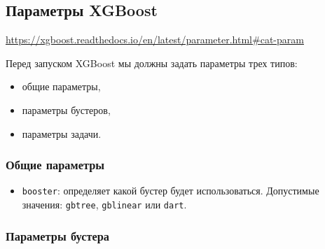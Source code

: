 \documentclass[%
	11pt,
	a4paper,
	utf8,
		]{article}
\begin{document}
\subsection{Параметры XGBoost}

\url{https://xgboost.readthedocs.io/en/latest/parameter.html#cat-param}

Перед запуском XGBoost мы должны задать параметры трех типов:
\begin{itemize}
	\item общие параметры,
	
	\item параметры бустеров,
	
	\item параметры задачи.
\end{itemize}

\subsubsection{Общие параметры}

\begin{itemize}
	\item \verb|booster|: определяет какой бустер будет использоваться. Допустимые значения: \verb|gbtree|, \verb|gblinear| или \verb|dart|.
\end{itemize}

\subsubsection{Параметры бустера}
\end{document}
